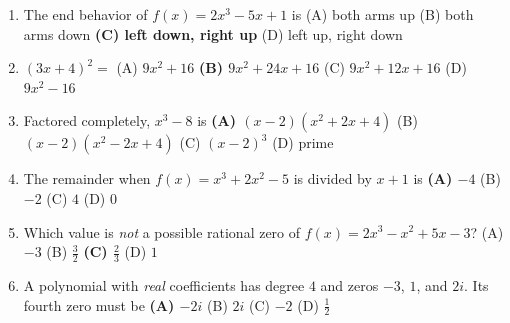 \documentclass[10pt]{article}
\begin{document}
\begin{enumerate}[leftmargin=\dimexpr1.9em+0.4in+6pt\relax, itemsep=9pt]
  \item \leavevmode\llap{\choicebox{\gradedblank[id=qb1, type=choice, points=2, answer={C}]{0.4in}{10pt}}\hspace{\dimexpr\leftmargin-0.4in-2pt\relax}}The end behavior of $f(x)=2x^3-5x+1$ is
    \hfill (A) both arms up \quad (B) both arms down \quad \textbf{(C) left down, right up} \ans{$\leftarrow$} \quad (D) left up, right down
  \item \leavevmode\llap{\choicebox{\gradedblank[id=qb2, type=choice, points=2, answer={B}]{0.4in}{10pt}}\hspace{\dimexpr\leftmargin-0.4in-2pt\relax}}$(3x+4)^2=$
    \hfill (A) $9x^2+16$ \quad \textbf{(B) $9x^2+24x+16$} \ans{$\leftarrow$} \quad (C) $9x^2+12x+16$ \quad (D) $9x^2-16$
  \item \leavevmode\llap{\choicebox{\gradedblank[id=qb3, type=choice, points=2, answer={A}]{0.4in}{10pt}}\hspace{\dimexpr\leftmargin-0.4in-2pt\relax}}Factored completely, $x^3-8$ is
    \hfill \textbf{(A) $(x-2)(x^2+2x+4)$} \ans{$\leftarrow$} \quad (B) $(x-2)(x^2-2x+4)$ \quad (C) $(x-2)^3$ \quad (D) prime
  \item \leavevmode\llap{\choicebox{\gradedblank[id=qb4, type=choice, points=2, answer={A}]{0.4in}{10pt}}\hspace{\dimexpr\leftmargin-0.4in-2pt\relax}}The remainder when $f(x)=x^3+2x^2-5$ is divided by $x+1$ is
    \hfill \textbf{(A) $-4$} \ans{$\leftarrow$} \quad (B) $-2$ \quad (C) $4$ \quad (D) $0$
  \item \leavevmode\llap{\choicebox{\gradedblank[id=qb5, type=choice, points=2, answer={C}]{0.4in}{10pt}}\hspace{\dimexpr\leftmargin-0.4in-2pt\relax}}Which value is \emph{not} a possible rational zero of $f(x)=2x^3-x^2+5x-3$?
    \hfill (A) $-3$ \quad (B) $\frac{3}{2}$ \quad \textbf{(C) $\frac{2}{3}$} \ans{$\leftarrow$} \quad (D) $1$
  \item \leavevmode\llap{\choicebox{\gradedblank[id=qb6, type=choice, points=2, answer={A}]{0.4in}{10pt}}\hspace{\dimexpr\leftmargin-0.4in-2pt\relax}}A polynomial with \emph{real} coefficients has degree $4$ and zeros $-3$, $1$, and $2i$. Its fourth zero must be
    \hfill \textbf{(A) $-2i$} \ans{$\leftarrow$} \quad (B) $2i$ \quad (C) $-2$ \quad (D) $\frac12$
\end{enumerate}
\end{document}
